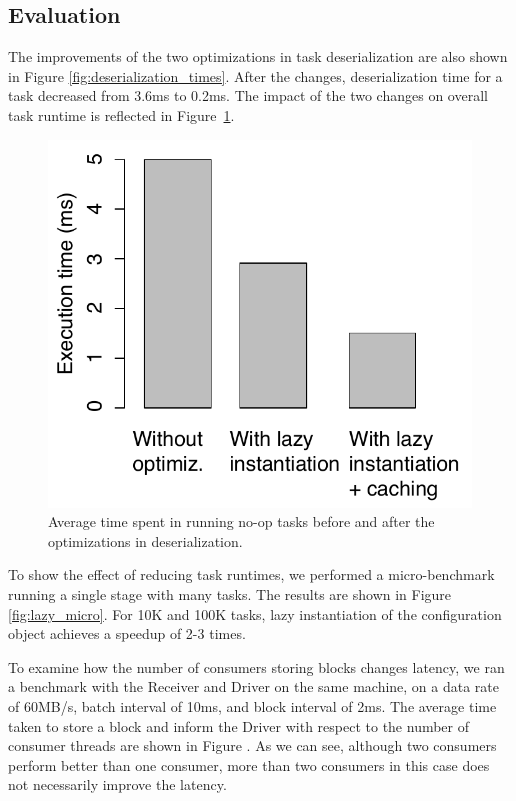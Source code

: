 \subsection{Evaluation}
The improvements of the two optimizations in task deserialization are also shown in Figure \ref{fig:deserialization_times}. After the changes, deserialization time for a task decreased from 3.6ms to 0.2ms. The impact of the two changes on overall task runtime is reflected in Figure~\ref{fig:runtime_optimizations}.

\begin{figure}[t!]
 \begin{center}
   \includegraphics[scale=0.60]{images_graphs/optimizations/graph3/runtime_optimizations.pdf}
 \end{center}
 \caption{Average time spent in running no-op tasks before and after the optimizations in deserialization.}
 \label{fig:runtime_optimizations}
\end{figure}

To show the effect of reducing task runtimes, we performed a micro-benchmark running a single stage with many tasks. The results are shown in Figure \ref{fig:lazy_micro}. For 10K and 100K tasks, lazy instantiation of the configuration object achieves a speedup of 2-3 times.

To examine how the number of consumers storing blocks changes latency, we ran a benchmark with the Receiver and Driver on the same machine, on a data rate of 60MB/s, batch interval of 10ms, and block interval of 2ms. The average time taken to store a block and inform the Driver with respect to the number of consumer threads are shown in Figure {}. As we can see, although two consumers perform better than one consumer, more than two consumers in this case does not necessarily improve the latency.


